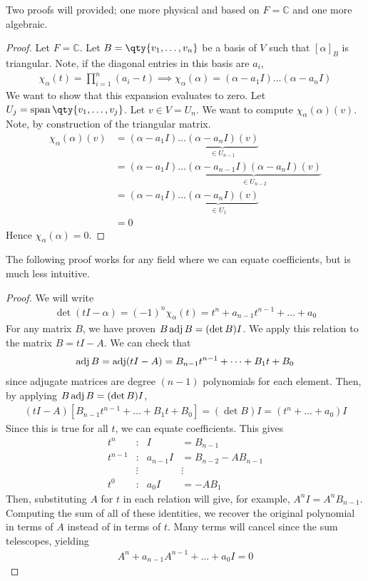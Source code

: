 Two proofs will provided; one more physical and based on $F = \mathbb C$ and one more algebraic.
\begin{proof}
	Let $F = \mathbb{C}$.
	Let $B = \qty{v_1, \dots, v_n}$ be a basis of $V$ such that $[\alpha]_B$ is triangular.
	Note, if the diagonal entries in this basis are $a_i$,
	\begin{align*}
		\chi_\alpha(t) = \prod_{i=1}^n (a_i - t) \implies \chi_\alpha(\alpha) = (\alpha - a_1 I) \dots (\alpha - a_n I)
	\end{align*}
	We want to show that this expansion evaluates to zero.
	Let $U_j = \vecspan \qty{v_1, \dots, v_j}$.
	Let $v \in V = U_n$.
	We want to compute $\chi_\alpha(\alpha)(v)$.
	Note, by construction of the triangular matrix.
	\begin{align*}
		\chi_\alpha(\alpha)(v) & = (\alpha - a_1 I) \dots \underbrace{(\alpha - a_n I)(v)}_{\in U_{n-1}} \\
		&= (\alpha - a_1 I) \dots \underbrace{(\alpha - a_{n-1} I)(\alpha - a_n I)(v)}_{\in U_{n-2}} \\
		&= (\alpha - a_1 I) \underbrace{\dots (\alpha - a_n I)(v)}_{\in U_1} \\
		&= 0
	\end{align*}
	Hence $\chi_\alpha(\alpha) = 0$.
\end{proof}
\noindent The following proof works for any field where we can equate coefficients, but is much less intuitive.
\begin{proof}
	We will write
	\begin{align*}
		\det(t I - \alpha) = (-1)^n \chi_\alpha(t) = t^n + a_{n-1}t^{n-1} + \dots + a_0
	\end{align*}
	For any matrix $B$, we have proven $B \operatorname{adj} B = (\det B) I$.
	We apply this relation to the matrix $B = tI - A$.
	We can check that
	\begin{align*}
		\operatorname{adj} B = \operatorname{adj}(tI - A) = B_{n-1} t^{n-1} + \dots + B_1 t + B_0
	\end{align*}
	since adjugate matrices are degree $(n-1)$ polynomials for each element.
	Then, by applying $B \operatorname{adj} B = (\det B) I$,
	\begin{align*}
		(tI - A) [ B_{n-1} t^{n-1} + \dots + B_1 t + B_0 ] = (\det B) I = (t^n + \dots + a_0) I
	\end{align*}
	Since this is true for all $t$, we can equate coefficients.
	This gives
	\begin{align*}
		t^n     & :      & I         & = B_{n-1}            \\
		t^{n-1} & :      & a_{n-1} I & = B_{n-2} - AB_{n-1} \\
		        & \vdots &           & \vdots               \\
		t^0     & :      & a_0 I     & = -A B_1
	\end{align*}
	Then, substituting $A$ for $t$ in each relation will give, for example, $A^n I = A^n B_{n-1}$.
	Computing the sum of all of these identities, we recover the original polynomial in terms of $A$ instead of in terms of $t$.
	Many terms will cancel since the sum telescopes, yielding
	\begin{align*}
		A^n + a_{n-1} A^{n-1} + \dots + a_0 I = 0
	\end{align*}
\end{proof}


